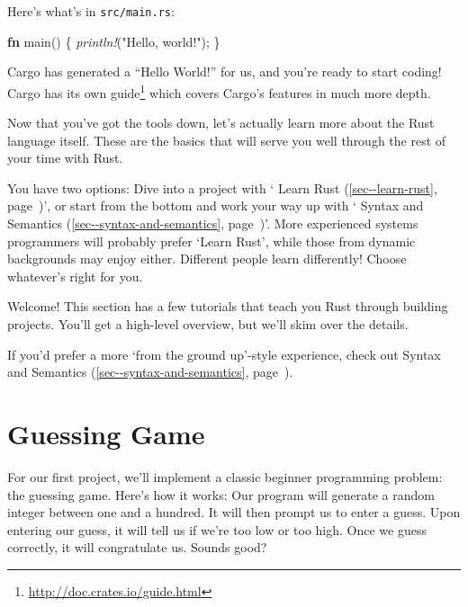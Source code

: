 \documentclass[a4paper,]{book}
\renewcommand*{\hyperref}[2][\ar]{%
  \def\ar{#2}%
  #2 (\autoref{#1}, page~\pageref{#1})}
\newenvironment{Shaded}{\begin{snugshade}}{\end{snugshade}}
\newcommand{\KeywordTok}[1]{\textcolor[rgb]{0.13,0.29,0.53}{\textbf{{#1}}}}
\newcommand{\StringTok}[1]{\textcolor[rgb]{0.31,0.60,0.02}{{#1}}}
\newcommand{\PreprocessorTok}[1]{\textcolor[rgb]{0.56,0.35,0.01}{\textit{{#1}}}}
\newcommand{\NormalTok}[1]{{#1}}
\renewcommand{\href}[2]{#2\footnote{\url{#1}}}
\begin{document}
Here's what's in \texttt{src/main.rs}:

\begin{Shaded}
\begin{Highlighting}[]
\KeywordTok{fn} \NormalTok{main() \{}
    \PreprocessorTok{println!}\NormalTok{(}\StringTok{"Hello, world!"}\NormalTok{);}
\NormalTok{\}}
\end{Highlighting}
\end{Shaded}

Cargo has generated a ``Hello World!'' for us, and you're ready to start
coding! Cargo has its own \href{http://doc.crates.io/guide.html}{guide}
which covers Cargo's features in much more depth.

Now that you've got the tools down, let's actually learn more about the
Rust language itself. These are the basics that will serve you well
through the rest of your time with Rust.

You have two options: Dive into a project with
`\hyperref[sec--learn-rust]{Learn Rust}', or start from the bottom and
work your way up with `\hyperref[sec--syntax-and-semantics]{Syntax and
Semantics}'. More experienced systems programmers will probably prefer
`Learn Rust', while those from dynamic backgrounds may enjoy either.
Different people learn differently! Choose whatever's right for you.


Welcome! This section has a few tutorials that teach you Rust through
building projects. You'll get a high-level overview, but we'll skim over
the details.

If you'd prefer a more `from the ground up'-style experience, check out
\hyperref[sec--syntax-and-semantics]{Syntax and Semantics}.

\section{Guessing Game}\label{sec--guessing-game}

For our first project, we'll implement a classic beginner programming
problem: the guessing game. Here's how it works: Our program will
generate a random integer between one and a hundred. It will then prompt
us to enter a guess. Upon entering our guess, it will tell us if we're
too low or too high. Once we guess correctly, it will congratulate us.
Sounds good?
\end{document}
